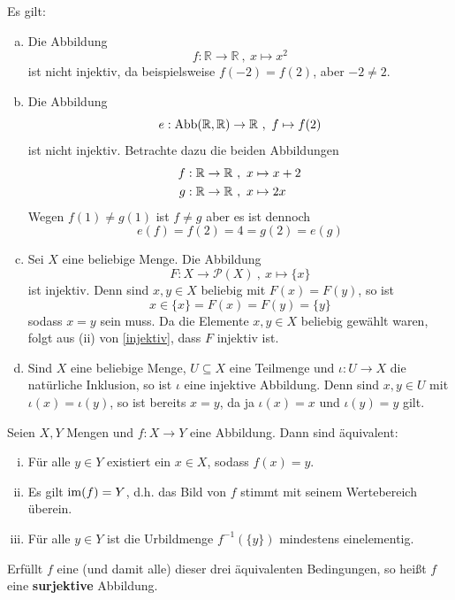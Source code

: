 \begin{bsp} Es gilt:
\begin{enumerate}[a)]
 \item Die Abbildung
 \[ f: \mathbb{R} \to \mathbb{R}\ ,\ x \mapsto x^2 \]
 ist nicht injektiv, da beispielsweise $f(-2)=f(2)$, aber $-2 \neq 2$.
 \item Die Abbildung
 \[ e: \text{Abb}({\mathbb R},{\mathbb R}) \to \mathbb{R}\ ,\ f \mapsto f(2)\]
 ist nicht injektiv. Betrachte dazu die beiden Abbildungen
 \begin{align*}
  f : {\mathbb R} \to {\mathbb R} \ &,\  x\mapsto x+2 \\
  g : {\mathbb R} \to {\mathbb R} \ &,\  x\mapsto 2x
 \end{align*}
 Wegen $f(1)\neq g(1)$ ist $f\neq g$ aber es ist dennoch
 \[ e(f)=f(2)=4=g(2)=e(g) \]
 \item Sei $X$ eine beliebige Menge. Die Abbildung
 \[ F : X \to \mathcal{P}(X) \ ,\ x \mapsto \{x\} \]
 ist injektiv. Denn sind $x,y\in X$ beliebig mit $F(x)=F(y)$, so ist
 \[ x\in \{x\} = F(x) = F(y) = \{y\} \]
 sodass $x=y$ sein muss. Da die Elemente $x,y\in X$ beliebig gewählt waren, folgt aus (ii) von \cref{injektiv}, dass $F$ injektiv ist.
 \item Sind $X$ eine beliebige Menge, $U\subseteq X$ eine Teilmenge und $\iota : U\to X$ die natürliche Inklusion, so ist $\iota$ eine injektive Abbildung. Denn sind $x,y\in U$ mit $\iota(x)=\iota(y)$, so ist bereits $x=y$, da ja $\iota(x)=x$ und $\iota(y)=y$ gilt.
\end{enumerate}
\end{bsp}
	

\begin{de} \label{surjektiv}
	Seien $X, Y$ Mengen und $f: X \to Y$ eine Abbildung. Dann sind
	äquivalent:
	\begin{enumerate}[(i)]
		\item Für alle $y\in Y$ existiert ein $x\in
		X$, sodass $f(x)=y$.
                \item Es gilt $\operatorname{im}(f) = Y$, d.h. das Bild von $f$ stimmt mit seinem Wertebereich überein.
		\item Für alle $y\in Y$ ist die Urbildmenge $f^{-1}(\{ y \})$ mindestens
		einelementig.
	\end{enumerate}
	Erfüllt $f$ eine (und damit alle) dieser drei äquivalenten Bedingungen, so heißt $f$ eine \textbf{surjektive} Abbildung.
\end{de}

